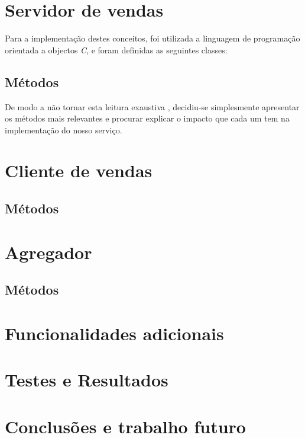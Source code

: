 \documentclass{article}
\begin{document}
\newpage
\section{Servidor de vendas}
Para a implementação destes conceitos, foi utilizada a linguagem de programação orientada a objectos \emph{C}, e foram definidas as seguintes classes:
\subsection{Métodos}
De modo a não tornar esta leitura exaustiva , decidiu-se simplesmente apresentar os métodos mais relevantes
e procurar explicar o impacto que cada um tem na implementação do nosso serviço.


\newpage
\section{Cliente de vendas}
\subsection{Métodos}


\newpage
\section{Agregador}
\subsection{Métodos}


\newpage
\section{Funcionalidades adicionais}





\newpage
\section{Testes e Resultados}


\newpage
\section{Conclusões e trabalho futuro}
\end{document}
